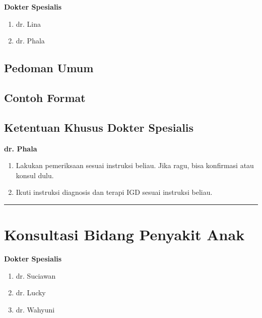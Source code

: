\documentclass[
]{book}
\providecommand{\tightlist}{%
  \setlength{\itemsep}{0pt}\setlength{\parskip}{0pt}}
\begin{document}
\textbf{Dokter Spesialis}

\begin{enumerate}
\def\labelenumi{\arabic{enumi}.}
\tightlist
\item
  dr. Lina
\item
  dr. Phala
\end{enumerate}

\hypertarget{pedoman-umum}{%
\subsection{Pedoman Umum}\label{pedoman-umum}}

\hypertarget{contoh-format}{%
\subsection{Contoh Format}\label{contoh-format}}

\hypertarget{ketentuan-khusus-dokter-spesialis-1}{%
\subsection{Ketentuan Khusus Dokter Spesialis}\label{ketentuan-khusus-dokter-spesialis-1}}

\textbf{dr. Phala}

\begin{enumerate}
\def\labelenumi{\arabic{enumi}.}
\item
  Lakukan pemeriksaan sesuai instruksi beliau. Jika ragu, bisa konfirmasi atau konsul dulu.
\item
  Ikuti instruksi diagnosis dan terapi IGD sesuai instruksi beliau.
\end{enumerate}

\begin{center}\rule{0.5\linewidth}{0.5pt}\end{center}

\hypertarget{konsultasi-bidang-penyakit-anak}{%
\section{Konsultasi Bidang Penyakit Anak}\label{konsultasi-bidang-penyakit-anak}}

\textbf{Dokter Spesialis}

\begin{enumerate}
\def\labelenumi{\arabic{enumi}.}
\tightlist
\item
  dr. Suciawan
\item
  dr. Lucky
\item
  dr. Wahyuni
\end{enumerate}
\end{document}
